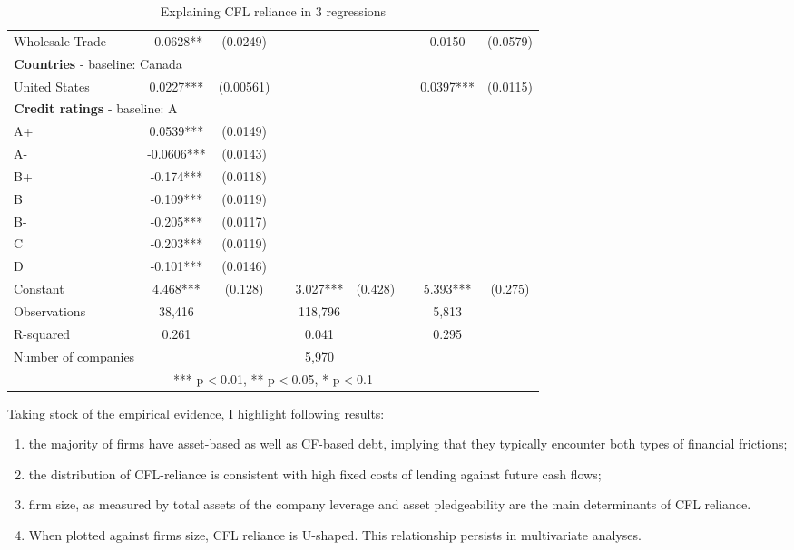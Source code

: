 \documentclass[12pt]{article}
\begin{document}
\begin{table}[H]
{\begin{tabular}{lcccccccc}
Wholesale Trade & -0.0628** & (0.0249) & & & & & 0.0150 & (0.0579) \vspace{2mm} \\
\multicolumn{9}{l}{\textbf{Countries}  - baseline: Canada} \\
United States & 0.0227*** & (0.00561) & & & & & 0.0397*** & (0.0115) \vspace{2mm} \\
 \multicolumn{9}{l}{\textbf{Credit ratings}  - baseline: A} \\
A+ & 0.0539*** & (0.0149) & & & & & & \\
A- & -0.0606*** & (0.0143) & & & & & & \\
B+ & -0.174*** & (0.0118) & & & & & & \\
B & -0.109*** & (0.0119) & & & & & & \\
B- & -0.205*** & (0.0117) & & & & & & \\
C & -0.203*** & (0.0119) & & & & & & \\
D & -0.101*** & (0.0146) & & & & & &  \vspace{2mm} \\
Constant & 4.468*** & (0.128) & & 3.027*** & (0.428) & & 5.393*** & (0.275) \\
\hline
Observations & 38,416 & & & 118,796 & & & 5,813 & \\
R-squared & 0.261 & & & 0.041 & & & 0.295 & \\
Number of companies & & & & 5,970 & & & & \\
\bottomrule
\multicolumn{9}{c}{*** p$<$0.01, ** p$<$0.05, * p$<$0.1} \\
\end{tabular}%
}
\caption{\small Explaining CFL reliance in 3 regressions}
\label{tab:regres}
\end{table}
\restoregeometry %

\noindent Taking stock of the empirical evidence, I highlight following results:
\begin{enumerate}[i]
    \item the majority of firms have asset-based as well as CF-based debt, implying that they typically encounter both types of financial frictions;
    \item the distribution of CFL-reliance is consistent with high fixed costs of lending against future cash flows;
    \item firm size, as measured by total assets of the company leverage and asset pledgeability are the main determinants of CFL reliance.
    \item When plotted against firms size, CFL reliance is U-shaped. This relationship persists in multivariate analyses.
\end{enumerate}
\end{document}
